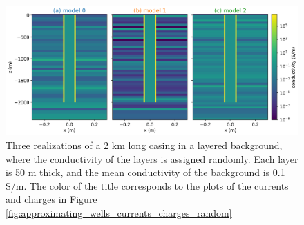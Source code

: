 \begin{figure}
    \begin{center}
    \includegraphics[width=\textwidth]{figures/dc_casing/random_layers.png}
    \end{center}
\caption{
    Three realizations of a 2 km long casing in a layered background, where the conductivity of the
    layers is assigned randomly. Each layer is 50 m thick, and the mean conductivity of the background
    is 0.1 S/m. The color of the title corresponds to the plots of the currents and charges in Figure
    \ref{fig:approximating_wells_currents_charges_random}
}
\label{fig:random_layers}
\end{figure}
